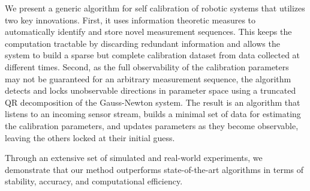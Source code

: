 

We present a generic algorithm for self calibration of robotic systems
that utilizes two key innovations. First, it uses information
theoretic measures to automatically identify and store novel
measurement sequences. This keeps the computation tractable by
discarding redundant information and allows the system to build a
sparse but complete calibration dataset from data collected at
different times. Second, as the full observability of the calibration
parameters may not be guaranteed for an arbitrary measurement
sequence, the algorithm detects and locks unobservable directions in
parameter space using a truncated QR decomposition of the Gauss-Newton
system. The result is an algorithm that listens to an incoming
sensor stream, builds a minimal set of data for estimating the
calibration parameters, and updates parameters as they become
observable, leaving the others locked at their initial guess.

Through an extensive set of simulated and real-world experiments, we
demonstrate that our method outperforms state-of-the-art algorithms in
terms of stability, accuracy, and computational efficiency.
